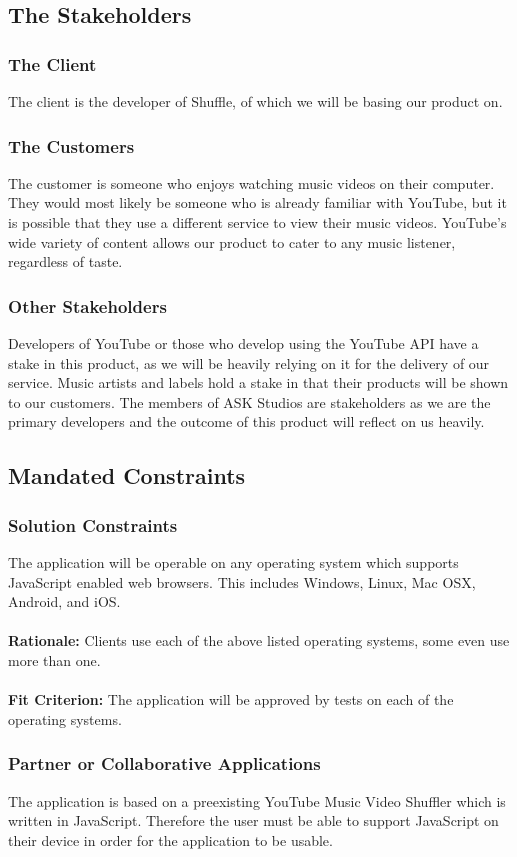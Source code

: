 \documentclass[12pt, titlepage]{article}
\begin{document}
\subsection{The Stakeholders}
\subsubsection{The Client}
The client is the developer of Shuffle, of which we will be basing our product on.
\subsubsection{The Customers}
The customer is someone who enjoys watching music videos on their computer.  They would most likely be someone who is already familiar with YouTube, but it is possible that they use a different service to view their music videos.  YouTube's wide variety of content allows our product to cater to any music listener, regardless of taste.
\subsubsection{Other Stakeholders}
Developers of YouTube or those who develop using the YouTube API have a stake in this product, as we will be heavily relying on it for the delivery of our service.  Music artists and labels hold a stake in that their products will be shown to our customers.  The members of ASK Studios are stakeholders as we are the primary developers and the outcome of this product will reflect on us heavily.

\subsection{Mandated Constraints}
\subsubsection{Solution Constraints}
The application will be operable on any operating system which supports JavaScript enabled web browsers. This includes Windows, Linux, Mac OSX, Android, and iOS. \\
\\
\textbf{Rationale:} Clients use each of the above listed operating systems, some even use more than one. \\\\
\textbf{Fit Criterion:} The application will be approved by tests on each of the operating systems.
\subsubsection{Partner or Collaborative Applications}
The application is based on a preexisting YouTube Music Video Shuffler which is written in JavaScript. Therefore the user must be able to support JavaScript on their device in order for the application to be usable.
\end{document}
